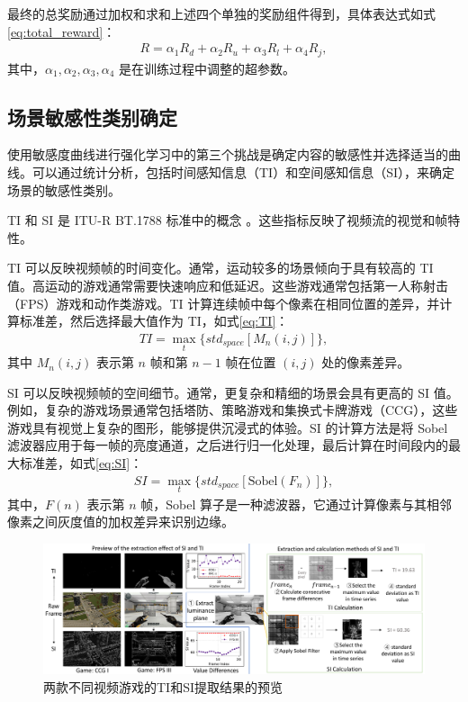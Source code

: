 最终的总奖励通过加权和求和上述四个单独的奖励组件得到，具体表达式如式\eqref{eq:total_reward}：
\begin{equation}
\begin{aligned}
R = \alpha_1 R_d + \alpha_2 R_u + \alpha_3 R_l + \alpha_4 R_j,
\end{aligned}
\label{eq:total_reward}
\end{equation}
其中，$\alpha_1, \alpha_2, \alpha_3, \alpha_4$ 是在训练过程中调整的超参数。

\subsection{场景敏感性类别确定} \label{sec-cat}
使用敏感度曲线进行强化学习中的第三个挑战是确定内容的敏感性并选择适当的曲线。可以通过统计分析，包括时间感知信息（TI）和空间感知信息（SI），来确定场景的敏感性类别。

TI 和 SI 是 ITU-R BT.1788 标准中的概念 \cite{yang2014comparison}。这些指标反映了视频流的视觉和帧特性。



TI 可以反映视频帧的时间变化。通常，运动较多的场景倾向于具有较高的 TI 值。高运动的游戏通常需要快速响应和低延迟。这些游戏通常包括第一人称射击（FPS）游戏和动作类游戏。TI 计算连续帧中每个像素在相同位置的差异，并计算标准差，然后选择最大值作为 TI，如式\eqref{eq:TI}：
\begin{equation}
\begin{aligned}
TI = \max_{t}\{std_{space}[M_n(i,j)]\},
\end{aligned}
\label{eq:TI}
\end{equation}
其中 $M_n(i,j)$ 表示第 $n$ 帧和第 $n-1$ 帧在位置 $(i,j)$ 处的像素差异。

SI 可以反映视频帧的空间细节。通常，更复杂和精细的场景会具有更高的 SI 值。例如，复杂的游戏场景通常包括塔防、策略游戏和集换式卡牌游戏（CCG），这些游戏具有视觉上复杂的图形，能够提供沉浸式的体验。SI 的计算方法是将 Sobel 滤波器应用于每一帧的亮度通道，之后进行归一化处理，最后计算在时间段内的最大标准差，如式\eqref{eq:SI}：
\begin{equation}
\begin{aligned}
SI= \max_{t}\{std_{space}[\mathrm{Sobel}(F_n)]\},
\end{aligned}
\label{eq:SI}
\end{equation}
其中，$F(n)$ 表示第 $n$ 帧，Sobel 算子是一种滤波器，它通过计算像素与其相邻像素之间灰度值的加权差异来识别边缘。

\begin{figure} [ht]
\centering
\includegraphics[width=\textwidth]{figures/chap03/intra_schematic_diagram.pdf} 
\caption{两款不同视频游戏的TI和SI提取结果的预览}
\label{fig_intra_schematic_diagram}
\end{figure}

